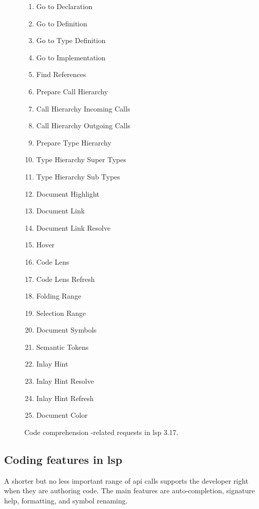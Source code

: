 \begin{figure}[t]\centering
	\begin{multicols}{2}
	\begin{enumerate}
		\item Go to Declaration
		\item Go to Definition \org
		\item Go to Type Definition
		\item Go to Implementation
		\item Find References \org
		\item Prepare Call Hierarchy
		\item Call Hierarchy Incoming Calls
		\item Call Hierarchy Outgoing Calls
		\item Prepare Type Hierarchy
		\item Type Hierarchy Super Types
		\item Type Hierarchy Sub Types
		\item Document Highlight \org
		\item Document Link \org
		\item Document Link Resolve \org
		\item Hover \org
		\item Code Lens \org
		\item Code Lens Refresh
		\item Folding Range
		\item Selection Range
		\item Document Symbols \org
		\item Semantic Tokens
		\item Inlay Hint
		\item Inlay Hint Resolve
		\item Inlay Hint Refresh
		\item Document Color
	\end{enumerate}
	\end{multicols}

	\caption{Code comprehension -related requests in \acrshort{lsp} 3.17.}
	\label{fig:comprehension-requests}
\end{figure}


\subsection{Coding features in \acrshort{lsp}}

A shorter but no less important range of \acrshort{api} calls supports the
developer right when they are authoring code. The main features are
auto-completion, signature help, formatting, and symbol renaming.

